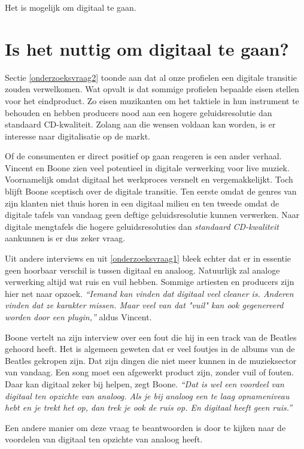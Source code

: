 Het is mogelijk om digitaal te gaan.

\section{Is het nuttig om digitaal te gaan?}

Sectie \ref{onderzoeksvraag2} toonde aan dat al onze profielen een digitale transitie zouden verwelkomen. Wat opvalt is dat sommige profielen bepaalde eisen stellen voor het eindproduct. Zo eisen muzikanten om het taktiele in hun instrument te behouden en hebben producers nood aan een hogere geluidsresolutie dan standaard CD-kwaliteit. Zolang aan die wensen voldaan kan worden, is er interesse naar digitalisatie op de markt.

Of de consumenten er direct positief op gaan reageren is een ander verhaal. Vincent en Boone zien veel potentieel in digitale verwerking voor live muziek. Voornamelijk omdat digitaal het werkproces versnelt en vergemakkelijkt. Toch blijft Boone sceptisch over de digitale transitie. Ten eerste omdat de genres van zijn klanten niet thuis horen in een digitaal milieu en ten tweede omdat de digitale tafels van vandaag geen deftige geluidsresolutie kunnen verwerken. Naar digitale mengtafels die hogere geluidsresoluties dan \textit{standaard CD-kwaliteit} \autocite{peterboone} aankunnen is er dus zeker vraag.

Uit andere interviews en uit \ref{onderzoeksvraag1} bleek echter dat er in essentie geen hoorbaar verschil is tussen digitaal en analoog. Natuurlijk zal analoge verwerking altijd wat ruis en vuil hebben. Sommige artiesten en producers zijn hier net naar opzoek. \textit{``Iemand kan vinden dat digitaal veel cleaner is. Anderen vinden dat ze karakter missen. Maar veel van dat "vuil" kan ook gegenereerd worden door een plugin,''} aldus Vincent. \autocite{bartvincent}

Boone vertelt na zijn interview over een fout die hij in een track van de Beatles gehoord heeft. Het is algemeen geweten dat er veel foutjes in de albums van de Beatles gekropen zijn. Dat zijn dingen die niet meer kunnen in de muzieksector van vandaag. Een song moet een afgewerkt product zijn, zonder vuil of fouten. Daar kan digitaal zeker bij helpen, zegt Boone. \textit{``Dat is wel een voordeel van digitaal ten opzichte van analoog. Als je bij analoog een te laag opnameniveau hebt en je trekt het op, dan trek je ook de ruis op. En digitaal heeft geen ruis.''} \autocite{peterboone}

Een andere manier om deze vraag te beantwoorden is door te kijken naar de voordelen van digitaal ten opzichte van analoog heeft.

